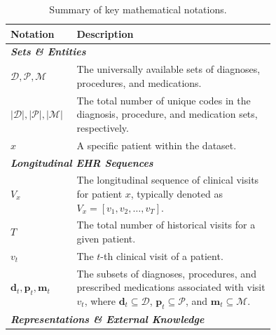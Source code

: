\documentclass[manuscript,review]{acmart}
\begin{document}

\begin{table}[h]
\centering
\scriptsize
\caption{Summary of key mathematical notations.}
\label{tab:notation}
\begin{tabular}{lp{0.75\linewidth}}
\toprule
\textbf{Notation} & \textbf{Description} \\
\midrule
\multicolumn{2}{l}{\textit{\textbf{Sets \& Entities}}} \\
\midrule
$\mathcal{D}, \mathcal{P}, \mathcal{M}$ & The universally available sets of diagnoses, procedures, and medications. \\
$|\mathcal{D}|, |\mathcal{P}|, |\mathcal{M}|$ & The total number of unique codes in the diagnosis, procedure, and medication sets, respectively. \\
$x$ & A specific patient within the dataset. \\
\midrule
\multicolumn{2}{l}{\textit{\textbf{Longitudinal EHR Sequences}}} \\
\midrule
$V_x$ & The longitudinal sequence of clinical visits for patient $x$, typically denoted as $V_x = [v_1, v_2, \dots, v_T]$. \\
$T$ & The total number of historical visits for a given patient. \\
$v_t$ & The $t$-th clinical visit of a patient. \\
$\mathbf{d}_t, \mathbf{p}_t, \mathbf{m}_t$ & The subsets of diagnoses, procedures, and prescribed medications associated with visit $v_t$, where $\mathbf{d}_t \subseteq \mathcal{D}$, $\mathbf{p}_t \subseteq \mathcal{P}$, and $\mathbf{m}_t \subseteq \mathcal{M}$. \\
\midrule
\multicolumn{2}{l}{\textit{\textbf{Representations \& External Knowledge}}} \\

\end{tabular}
\end{table}
\end{document}
